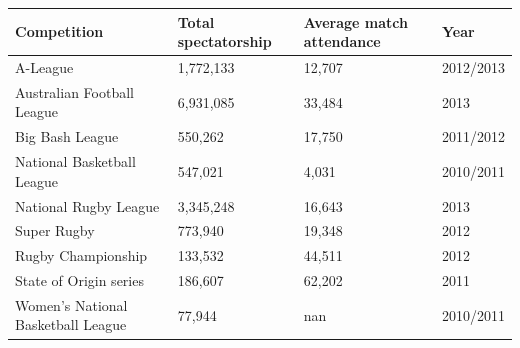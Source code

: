 \documentclass{article}
\begin{document}
\begin{tabular}{llll}
\toprule
Competition & Total spectatorship & Average match attendance & Year \\
\midrule
A-League & 1,772,133 & 12,707 & 2012/2013 \\
Australian Football League & 6,931,085 & 33,484 & 2013 \\
Big Bash League & 550,262 & 17,750 & 2011/2012 \\
National Basketball League & 547,021 & 4,031 & 2010/2011 \\
National Rugby League & 3,345,248 & 16,643 & 2013 \\
Super Rugby & 773,940 & 19,348 & 2012 \\
Rugby Championship & 133,532 & 44,511 & 2012 \\
State of Origin series & 186,607 & 62,202 & 2011 \\
Women's National Basketball League & 77,944 & nan & 2010/2011 \\
\bottomrule
\end{tabular}
\end{document}
